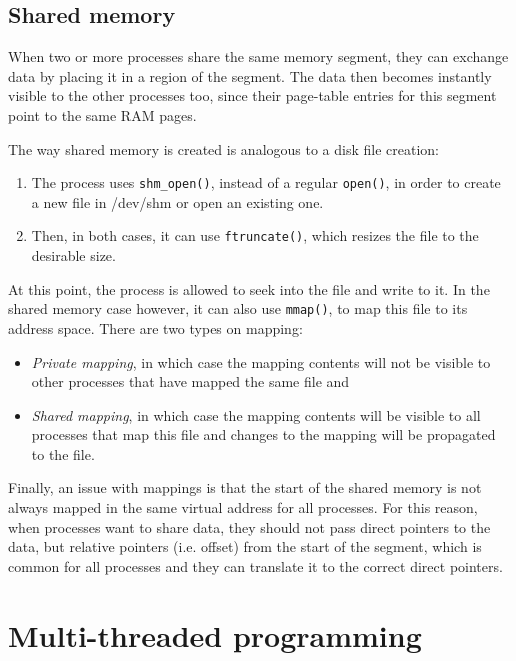 \subsection{Shared memory}

When two or more processes share the same memory segment, they can exchange 
data by placing it in a region of the segment. The data then becomes instantly 
visible to the other processes too, since their page-table entries for this 
segment point to the same RAM pages.

The way shared memory is created is analogous to a disk file creation:

\begin{enumerate}
	\item The process uses \texttt{shm\_open()}, instead of a regular 
		\texttt{open()}, in order to create a new file in /dev/shm or 
		open an existing one.
	\item Then, in both cases, it can use \texttt{ftruncate()}, which 
		resizes the file to the desirable size.
\end{enumerate}

At this point, the process is allowed to seek into the file and write to it. In 
the shared memory case however, it can also use \texttt{mmap()}, to map this 
file to its address space. There are two types on mapping:

\begin{itemize}
	\item \textit{Private mapping}, in which case the mapping contents will 
		not be visible to other processes that have mapped the same 
		file and
	\item \textit{Shared mapping}, in which case the mapping contents will 
		be visible to all processes that map this file and changes to 
		the mapping will be propagated to the file.
\end{itemize}

Finally, an issue with mappings is that the start of the shared memory is not 
always mapped in the same virtual address for all processes. For this reason, 
when processes want to share data, they should not pass direct pointers to the 
data, but relative pointers (i.e. offset) from the start of the segment, which 
is common for all processes and they can translate it to the correct direct 
pointers.

\section{Multi-threaded programming}

